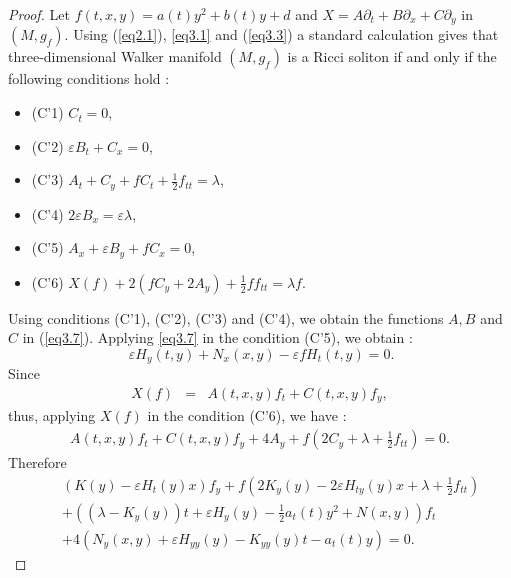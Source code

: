 \documentclass[reqno, 12pt]{amsart}
\numberwithin{equation}{section}
\begin{document}
\begin{proof}
Let $f(t,x,y)=a(t) y^{2}+b(t) y+d$ and 
$X = A\partial_t+ B\partial_x + C \partial_y $ in $(M, g_f)$.  Using (\ref{eq2.1}),  \eqref{eq3.1} and (\ref{eq3.3}) a standard calculation gives that three-dimensional 
Walker manifold $(M,g_f)$ is a Ricci soliton if and only if the following conditions 
hold :
\begin{itemize}
\item (C'1) $C_t= 0$,  
\item (C'2) $\varepsilon B_t + C_x = 0$,  
\item (C'3) $A_t + C_y + fC_t + \frac{1}{2}f_{tt} = \lambda$,  
\item (C'4) $2\varepsilon B_x = \varepsilon\lambda$,  
\item (C'5) $ A_x +\varepsilon B_y + fC_x=0$,  
\item (C'6) $ X(f) + 2\left( fC_y + 2A_y\right) + \frac{1}{2}ff_{tt} =\lambda f$. 
\end{itemize}
Using conditions (C'1), (C'2), (C'3) and (C'4), we obtain the functions $A, B$ 
and $C$ in (\ref{eq3.7}). Applying \eqref{eq3.7} in the condition (C'5), we 
obtain :
\begin{equation*}\
\varepsilon H_{y}(t,y) + N_{x}(x,y) - \varepsilon fH_{t}(t,y)=0.
\end{equation*}
Since
\begin{eqnarray*}
X(f)&=&A(t,x,y)f_t+C(t,x,y)f_y,
\end{eqnarray*}
thus, applying $X(f)$ in the condition (C'6), we have :
 \begin{eqnarray*}
 A(t,x,y)f_t + C(t,x,y)f_y + 4A_y  + f\left( 2C_y +\lambda + \frac{1}{2}f_{tt}\right)   =0.\end{eqnarray*}
 Therefore
\begin{align*}
 && \left(K(y) - \varepsilon H_{t}(y)x\right) f_y + f\left(2K_y(y) - 2\varepsilon H_{ty}(y)x 
 + \lambda +  \frac{1}{2}f_{tt}\right)\nonumber  \\
 &&+ \left( \left( \lambda - K_y(y)\right)t + \varepsilon H_{y}(y) 
 - \frac{1}{2}a_{t}(t)y^2 + N(x,y)\right) f_t\nonumber\\
&&+4\left( N_y(x,y) + \varepsilon H_{yy}(y) - K_{yy}(y)t
- a_t(t)y \right) = 0.
 \end{align*}
 \end{proof}
 
\end{document}
